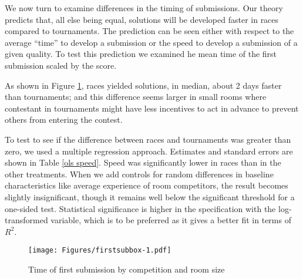\documentclass[11pt, titlepage]{article}
\begin{document}
We now turn to examine differences in the timing of submissions. Our
theory predicts that, all else being equal, solutions will be developed
faster in races compared to tournaments. The prediction can be seen
either with respect to the average ``time'' to develop a submission or
the speed to develop a submission of a given quality. To test this
prediction we examined he mean time of the first submission scaled by
the score.

As shown in Figure \ref{room time}, races yielded solutions, in median,
about 2 days faster than tournaments; and this difference seems larger
in small rooms where contestant in tournaments might have less
incentives to act in advance to prevent others from entering the
contest.

To test to see if the difference between races and tournaments was
greater than zero, we used a multiple regression approach. Estimates and
standard errors are shown in Table \ref{ols speed}. Speed was
significantly lower in races than in the other treatments. When we add
controls for random differences in baseline characteristics like average
experience of room competitors, the result becomes slightly
insignificant, though it remains well below the significant threshold
for a one-sided test. Statistical significance is higher in the
specification with the log-transformed variable, which is to be
preferred as it gives a better fit in terms of \(R^2\).

\begin{figure}
\caption{Time of first submission by competition and room size}
\label{room time}
\texttt{[image: Figures/firstsubbox-1.pdf]}
\end{figure}
\end{document}
